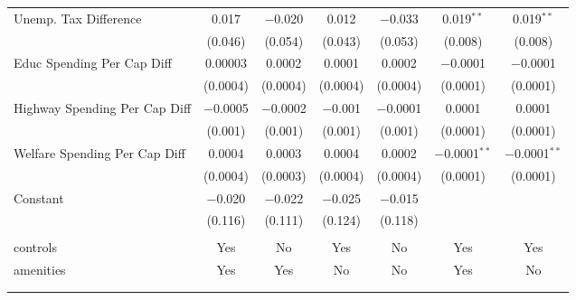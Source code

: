 \begin{table}[!htbp]
\begin{tabular}{@{\extracolsep{5pt}}lcccccc}
  Unemp. Tax Difference & 0.017 & $-$0.020 & 0.012 & $-$0.033 & 0.019$^{**}$ & 0.019$^{**}$ \\ 
  & (0.046) & (0.054) & (0.043) & (0.053) & (0.008) & (0.008) \\ 
  Educ Spending Per Cap Diff & 0.00003 & 0.0002 & 0.0001 & 0.0002 & $-$0.0001 & $-$0.0001 \\ 
  & (0.0004) & (0.0004) & (0.0004) & (0.0004) & (0.0001) & (0.0001) \\ 
  Highway Spending Per Cap Diff & $-$0.0005 & $-$0.0002 & $-$0.001 & $-$0.0001 & 0.0001 & 0.0001 \\ 
  & (0.001) & (0.001) & (0.001) & (0.001) & (0.0001) & (0.0001) \\ 
  Welfare Spending Per Cap Diff & 0.0004 & 0.0003 & 0.0004 & 0.0002 & $-$0.0001$^{**}$ & $-$0.0001$^{**}$ \\ 
  & (0.0004) & (0.0003) & (0.0004) & (0.0004) & (0.0001) & (0.0001) \\ 
  Constant & $-$0.020 & $-$0.022 & $-$0.025 & $-$0.015 &  &  \\ 
  & (0.116) & (0.111) & (0.124) & (0.118) &  &  \\ 
 \hline \\[-1.8ex] 
controls & Yes & No & Yes & No & Yes & Yes \\ 
amenities & Yes & Yes & No & No & Yes & No \\ 
\hline \\[-1.8ex] 
\hline 
\hline \\[-1.8ex] 
\end{tabular} 
\end{table} 
